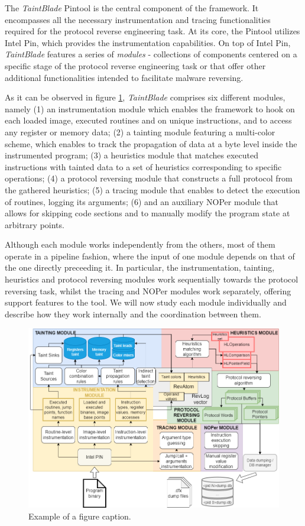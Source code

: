 \documentclass[conference]{IEEEtran}
\begin{document}
The \textit{TaintBlade} Pintool is the central component of the framework. It
encompasses all the necessary instrumentation and tracing functionalities
required for the protocol reverse engineering task. At its core, the Pintool
utilizes Intel Pin, which provides the instrumentation capabilities. On top of
Intel Pin, \textit{TaintBlade} features a series of \textit{modules} -
collections of components centered on a specific stage of the protocol reverse
engineering task or that offer other additional functionalities intended to
facilitate malware reversing.

As it can be observed in figure \ref{figure:fig_3_archdetailedsteps},
\textit{TaintBlade} comprises six different modules, namely (1) an
instrumentation module which enables the framework to hook on each loaded
image, executed routines and on unique instructions, and to access any register
or memory data; (2) a tainting module featuring a multi-color scheme, which
enables to track the propagation of data at a byte level inside the
instrumented program; (3) a heuristics module that matches executed
instructions with tainted data to a set of heuristics corresponding to specific
operations; (4) a protocol reversing module that constructs a full protocol
from the gathered heuristics; (5) a tracing module that enables to detect the
execution of routines, logging its arguments; (6) and an auxiliary NOPer module
that allows for skipping code sections and to manually modify the program state
at arbitrary points.

Although each module works independently from the others, most of them operate
in a pipeline fashion, where the input of one module depends on that of the one
directly preceeding it. In particular, the instrumentation, tainting,
heuristics and protocol reversing modules work sequentially towards the
protocol reversing task, whilst the tracing and NOPer modules work separately,
offering support features to the tool. We will now study each module
individually and describe how they work internally and the coordination between
them.

\begin{figure}
    \centerline{\includegraphics[width=\textwidth]{images/archdetailedsteps.drawio.png}}
    \caption{Example of a figure caption.}
    \label{figure:fig_3_archdetailedsteps}
\end{figure}
\end{document}
